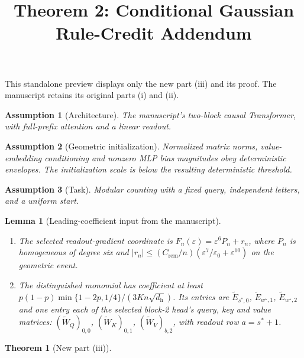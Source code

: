 \documentclass[11pt]{article}
\title{Theorem 2: Conditional Gaussian Rule-Credit Addendum}
\date{}
\newtheorem{theorem}{Theorem}
\newtheorem{lemma}{Lemma}
\newtheorem{assumption}{Assumption}
\begin{document}
\maketitle
This standalone preview displays only the new part (iii) and its proof.
The manuscript retains its original parts (i) and (ii).
\begin{assumption}[Architecture]\label{ass:arch}
The manuscript's two-block causal Transformer, with full-prefix attention and a linear readout.
\end{assumption}
\begin{assumption}[Geometric initialization]\label{ass:init}
Normalized matrix norms, value-embedding conditioning and nonzero MLP bias magnitudes obey deterministic envelopes. The initialization scale is below the resulting deterministic threshold.
\end{assumption}
\begin{assumption}[Task]\label{ass:task}
Modular counting with a fixed query, independent letters, and a uniform start.
\end{assumption}
\begin{lemma}[Leading-coefficient input from the manuscript]\label{lem:leading}
\begin{enumerate}[label=(\roman*)]
\item The selected readout-gradient coordinate is $F_n(\varepsilon)=\varepsilon^6P_n+r_n$,
where $P_n$ is homogeneous of degree six and
$|r_n|\le(C_{\mathrm{rem}}/n)(\varepsilon^7/\varepsilon_0+\varepsilon^{10})$
on the geometric event.
\item The distinguished monomial has coefficient at least
$p(1-p)\min\{1-2p,1/4\}/(3Kn\sqrt{d_{\mathrm h}})$.
Its entries are $\tilde E_{s^\ast,0}$, $\tilde E_{w^\star,1}$,
$\tilde E_{w^\star,2}$ and one entry each of the selected block-2 head's
query, key and value matrices: $(\tilde W_Q)_{0,0}$, $(\tilde W_K)_{0,1}$,
$(\tilde W_V)_{b,2}$, with readout row $a=s^\ast+1$.
\end{enumerate}
\end{lemma}
\begin{theorem}[New part (iii)]
\begin{enumerate}[label=(\roman*),start=3]

\end{enumerate}
\end{theorem}



\end{document}
